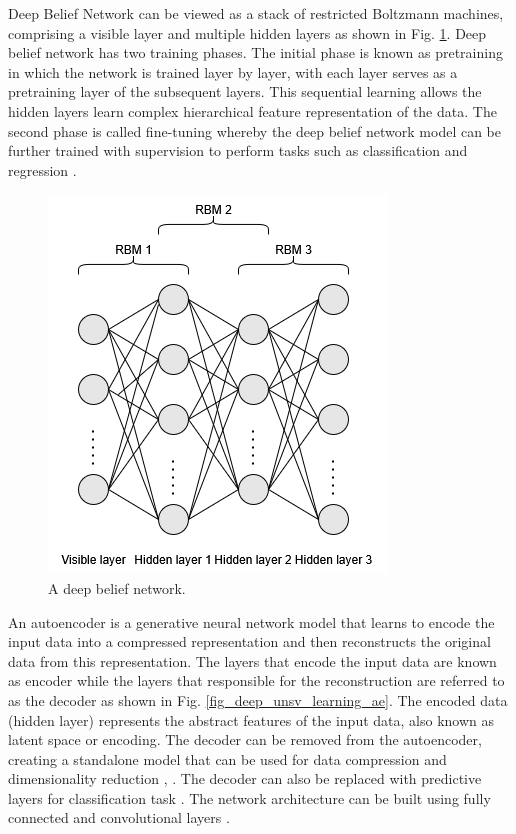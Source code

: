 \documentclass[preprint,12pt]{elsarticle}
\begin{document}
Deep Belief Network can be viewed as a stack of restricted Boltzmann machines, comprising a visible layer and multiple hidden layers \citep{hinton_fast_2006} as shown in Fig. \ref{fig_deep_unsv_learning_dbn}. Deep belief network has two training phases. The initial phase is known as pretraining in which the network is trained layer by layer, with each layer serves as a pretraining layer of the subsequent layers. This sequential learning allows the hidden layers learn complex hierarchical feature representation of the data. The second phase is called fine-tuning whereby the deep belief network model can be further trained with supervision to perform tasks such as classification and regression \citep{hinton_deep_2009}.

\begin{figure}[h!]
    \centering
    \includegraphics[scale=0.6]{fig_deep_unsv_learning_dbn.png}
    \caption{A deep belief network.}
    \label{fig_deep_unsv_learning_dbn}
\end{figure}

An autoencoder is a generative neural network model that learns to encode the input data into a compressed representation and then reconstructs the original data from this representation. The layers that encode the input data are known as encoder while the layers that responsible for the reconstruction are referred to as the decoder as shown in Fig. \ref{fig_deep_unsv_learning_ae}. The encoded data (hidden layer) represents the abstract features of the input data, also known as latent space or encoding. The decoder can be removed from the autoencoder, creating a standalone model that can be used for data compression and dimensionality reduction \citep{romero_quantum_2017}, \citep{li_guided_2020}. The decoder can also be replaced with predictive layers for classification task \citep{mohd_noor_feature_2021}. The network architecture can be built using fully connected and convolutional layers \citep{li_comprehensive_2023}. 
\end{document}
